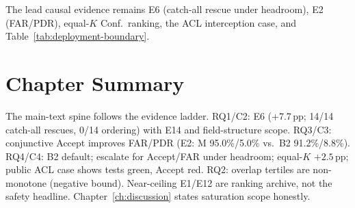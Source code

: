 \noindent The lead causal evidence remains E6 (catch-all rescue under
headroom), E2 (FAR/PDR), equal-$K$ Conf.\ ranking, the ACL interception case,
and Table~\ref{tab:deployment-boundary}.

\section*{Chapter Summary}

The main-text spine follows the evidence ladder.
RQ1/C2: E6 (+7.7\,pp; 14/14 catch-all rescues, 0/14 ordering) with E14 and
field-structure scope.
RQ3/C3: conjunctive Accept improves FAR/PDR (E2: M 95.0\%/5.0\% vs.\ B2
91.2\%/8.8\%).
RQ4/C4: B2 default; escalate for Accept/FAR under headroom; equal-$K$
${+}2.5$\,pp; public ACL case shows tests green, Accept red.
RQ2: overlap tertiles are non-monotone (negative bound).
Near-ceiling E1/E12 are ranking archive, not the safety headline.
Chapter~\ref{ch:discussion} states saturation scope honestly.
